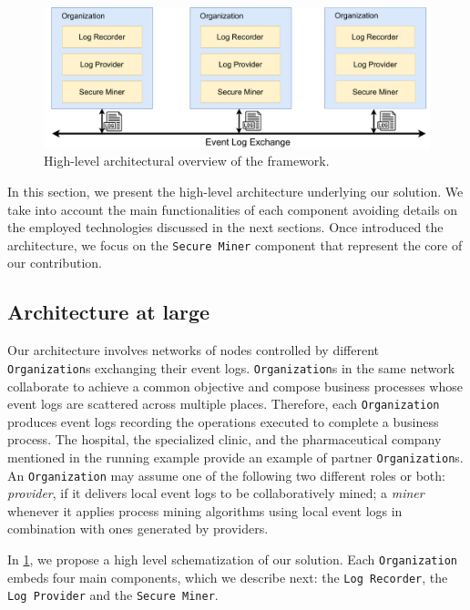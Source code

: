 \begin{figure}[t]
\centering
\includegraphics[width=13cm]{content/figures/architecture_diagram.pdf}
\caption{High-level architectural overview of the framework.}
\label{fig:architecture_diagram}
\end{figure}
In this section, we present the high-level architecture underlying our solution. We take into account the main functionalities of each component avoiding details on the employed technologies discussed in the next sections. Once introduced the architecture, we focus on the \texttt{Secure Miner} component that represent the core of our contribution.

\subsection{Architecture at large}
Our architecture involves networks of nodes controlled by different \texttt{Organization}s exchanging their event logs. \texttt{Organization}s in the same network collaborate to achieve a common objective and compose business processes whose event logs are scattered across multiple places. Therefore, each \texttt{Organization} produces event logs recording the operations executed to complete a business process. The hospital, the specialized clinic, and the pharmaceutical company mentioned in the running example provide an example of partner \texttt{Organization}s. An \texttt{Organization} may assume one of the following two different roles or both: \textit{provider}, if it delivers local event logs to be collaboratively mined; a \textit{miner} whenever it applies process mining algorithms using local event logs in combination with ones generated by providers. %

In \cref{fig:architecture_diagram}, we propose a high level schematization of our solution. Each \texttt{Organization} embeds four main components, which we describe next: the \texttt{Log Recorder}, the \texttt{Log Provider} and the \texttt{Secure Miner}.

